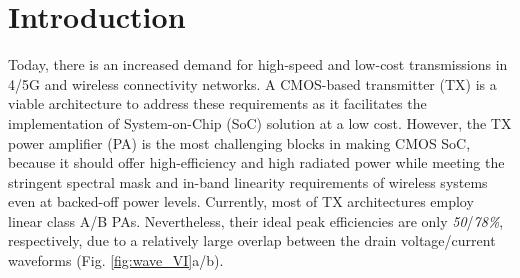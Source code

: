 \documentclass[conference]{IEEEtran}
\begin{document}
\section{Introduction}
Today, there is an increased demand for high-speed and low-cost transmissions in 4/5G and wireless connectivity networks. A CMOS-based transmitter (TX) is a viable architecture to address these requirements as it facilitates the implementation of System-on-Chip (SoC) solution at a low cost. However, the TX power amplifier (PA) is the most challenging blocks in making CMOS SoC, because it should offer high-efficiency and high radiated power while meeting the stringent spectral mask  and in-band linearity requirements of wireless systems even at backed-off power levels. Currently, most of TX architectures employ linear class A/B PAs. Nevertheless, their ideal  peak efficiencies are only \textit{50}/\textit{78\%}, respectively, due to a relatively large overlap between the drain voltage/current  waveforms (Fig. \ref{fig:wave_VI}a/b).
\end{document}

